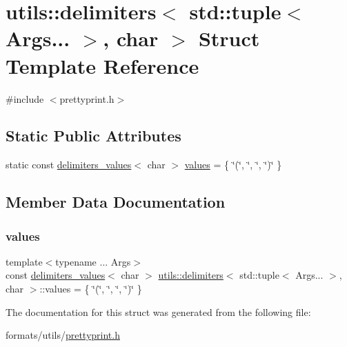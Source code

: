 \hypertarget{structutils_1_1delimiters_3_01std_1_1tuple_3_01_args_8_8_8_01_4_00_01char_01_4}{}\section{utils\+::delimiters$<$ std\+::tuple$<$ Args... $>$, char $>$ Struct Template Reference}
\label{structutils_1_1delimiters_3_01std_1_1tuple_3_01_args_8_8_8_01_4_00_01char_01_4}


{\ttfamily \#include $<$prettyprint.\+h$>$}

\subsection*{Static Public Attributes}
\begin{DoxyCompactItemize}
\item 
static const \mbox{\hyperlink{structutils_1_1delimiters__values}{delimiters\+\_\+values}}$<$ char $>$ \mbox{\hyperlink{structutils_1_1delimiters_3_01std_1_1tuple_3_01_args_8_8_8_01_4_00_01char_01_4_a2c35affe6c48878fddeebf9db304bb87}{values}} = \{ \char`\"{}(\char`\"{}, \char`\"{}, \char`\"{}, \char`\"{})\char`\"{} \}
\end{DoxyCompactItemize}


\subsection{Member Data Documentation}
\mbox{\label{structutils_1_1delimiters_3_01std_1_1tuple_3_01_args_8_8_8_01_4_00_01char_01_4_a2c35affe6c48878fddeebf9db304bb87}} 
\subsubsection{\texorpdfstring{values}{values}}
{\footnotesize\ttfamily template$<$typename ... Args$>$ \\
const \mbox{\hyperlink{structutils_1_1delimiters__values}{delimiters\+\_\+values}}$<$ char $>$ \mbox{\hyperlink{structutils_1_1delimiters}{utils\+::delimiters}}$<$ std\+::tuple$<$ Args... $>$, char $>$\+::values = \{ \char`\"{}(\char`\"{}, \char`\"{}, \char`\"{}, \char`\"{})\char`\"{} \}\hspace{0.3cm}{\ttfamily [static]}}



The documentation for this struct was generated from the following file\+:\begin{DoxyCompactItemize}
\item 
formats/utils/\mbox{\hyperlink{prettyprint_8h}{prettyprint.\+h}}\end{DoxyCompactItemize}

